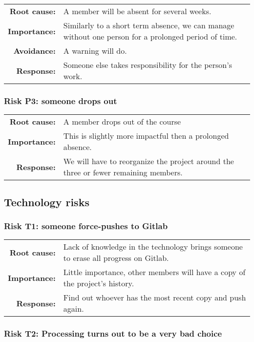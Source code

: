 \begin{tabularx}{\textwidth}{rX}
\textbf{Root cause:} & A member will be absent for several weeks. \\
\textbf{Importance:} & Similarly to a short term absence, we can manage without one person for a prolonged period of time. \\
\textbf{Avoidance:} & A warning will do. \\
\textbf{Response:} & Someone else takes responsibility for the person’s work. \\
\end{tabularx}

\subsubsection{Risk P3: someone drops out}

\begin{tabularx}{\textwidth}{rX}
\textbf{Root cause:} & A member drops out of the course \\
\textbf{Importance:} & This is slightly more impactful then a prolonged absence. \\
\textbf{Response:} & We will have to reorganize the project around the three or fewer remaining members. \\
\end{tabularx}

\subsection{Technology risks}

\subsubsection{Risk T1: someone force-pushes to Gitlab}

\begin{tabularx}{\textwidth}{rX}
\textbf{Root cause:} & Lack of knowledge in the technology brings someone to erase all progress on Gitlab. \\
\textbf{Importance:} & Little importance, other members will have a copy of the project’s history. \\
\textbf{Response:} & Find out whoever has the most recent copy and push again. \\
\end{tabularx}

\subsubsection{Risk T2: Processing turns out to be a very bad choice}

